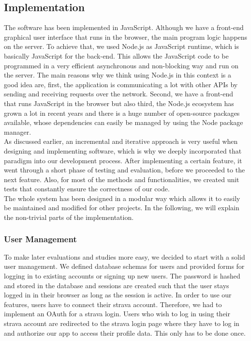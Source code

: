 \documentclass{sigchi}
\begin{document}
\subsection{Implementation}
The software has been implemented in JavaScript. Although we have a front-end graphical user interface that runs in the browser, the main program logic happens on the server. To achieve that, we used Node.js as JavaScript runtime, which is basically JavaScript for the back-end. This allows the JavaScript code to be programmed in a very efficient asynchronous and non-blocking way and run on the server. The main reasons why we think using Node.js in this context is a good idea are, first, the application is communicating a lot with other APIs by sending and receiving requests over the network. Second, we have a front-end that runs JavaScript in the browser but also third, the Node.js ecosystem has grown a lot in recent years and there is a huge number of open-source packages available, whose dependencies can easily be managed by using the Node package manager.\\
As discussed earlier, an incremental and iterative approach is very useful when designing and implementing software, which is why we deeply incorporated that paradigm into our development process. After implementing a certain feature, it went through a short phase of testing and evaluation, before we proceeded to the next feature. Also, for most of the methods and functionalities, we created unit tests that constantly ensure the correctness of our code.\\
The whole system has been designed in a modular way which allows it to easily be maintained and modified for other projects. In the following, we will explain the non-trivial parts of the implementation.
\subsubsection{User Management}
To make later evaluations and studies more easy, we decided to start with a solid user management. We defined database schemas for users and provided forms for logging in to existing accounts or signing up new users. The password is hashed and stored in the database and sessions are created such that the user stays logged in in their browser as long as the session is active. In order to use our features, users have to connect their strava account. Therefore, we had to implement an OAuth for a strava login. Users who wish to log in using their strava account are redirected to the strava login page where they have to log in and authorize our app to access their profile data. This only has to be done once.
\end{document}
